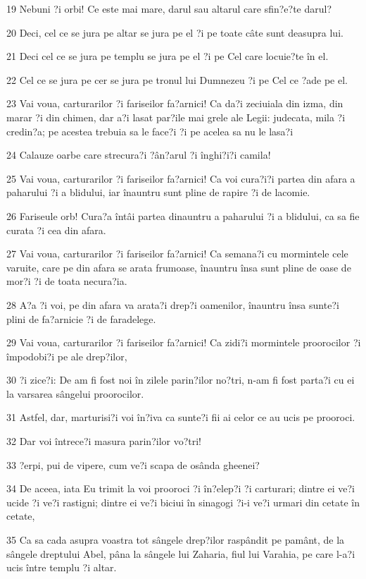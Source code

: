 \par 19 Nebuni ?i orbi! Ce este mai mare, darul sau altarul care sfin?e?te darul?
\par 20 Deci, cel ce se jura pe altar se jura pe el ?i pe toate câte sunt deasupra lui.
\par 21 Deci cel ce se jura pe templu se jura pe el ?i pe Cel care locuie?te în el.
\par 22 Cel ce se jura pe cer se jura pe tronul lui Dumnezeu ?i pe Cel ce ?ade pe el.
\par 23 Vai voua, carturarilor ?i fariseilor fa?arnici! Ca da?i zeciuiala din izma, din marar ?i din chimen, dar a?i lasat par?ile mai grele ale Legii: judecata, mila ?i credin?a; pe acestea trebuia sa le face?i ?i pe acelea sa nu le lasa?i
\par 24 Calauze oarbe care strecura?i ?ân?arul ?i înghi?i?i camila!
\par 25 Vai voua, carturarilor ?i fariseilor fa?arnici! Ca voi cura?i?i partea din afara a paharului ?i a blidului, iar înauntru sunt pline de rapire ?i de lacomie.
\par 26 Fariseule orb! Cura?a întâi partea dinauntru a paharului ?i a blidului, ca sa fie curata ?i cea din afara.
\par 27 Vai voua, carturarilor ?i fariseilor fa?arnici! Ca semana?i cu mormintele cele varuite, care pe din afara se arata frumoase, înauntru însa sunt pline de oase de mor?i ?i de toata necura?ia.
\par 28 A?a ?i voi, pe din afara va arata?i drep?i oamenilor, înauntru însa sunte?i plini de fa?arnicie ?i de faradelege.
\par 29 Vai voua, carturarilor ?i fariseilor fa?arnici! Ca zidi?i mormintele proorocilor ?i împodobi?i pe ale drep?ilor,
\par 30 ?i zice?i: De am fi fost noi în zilele parin?ilor no?tri, n-am fi fost parta?i cu ei la varsarea sângelui proorocilor.
\par 31 Astfel, dar, marturisi?i voi în?iva ca sunte?i fii ai celor ce au ucis pe prooroci.
\par 32 Dar voi întrece?i masura parin?ilor vo?tri!
\par 33 ?erpi, pui de vipere, cum ve?i scapa de osânda gheenei?
\par 34 De aceea, iata Eu trimit la voi prooroci ?i în?elep?i ?i carturari; dintre ei ve?i ucide ?i ve?i rastigni; dintre ei ve?i biciui în sinagogi ?i-i ve?i urmari din cetate în cetate,
\par 35 Ca sa cada asupra voastra tot sângele drep?ilor raspândit pe pamânt, de la sângele dreptului Abel, pâna la sângele lui Zaharia, fiul lui Varahia, pe care l-a?i ucis între templu ?i altar.
